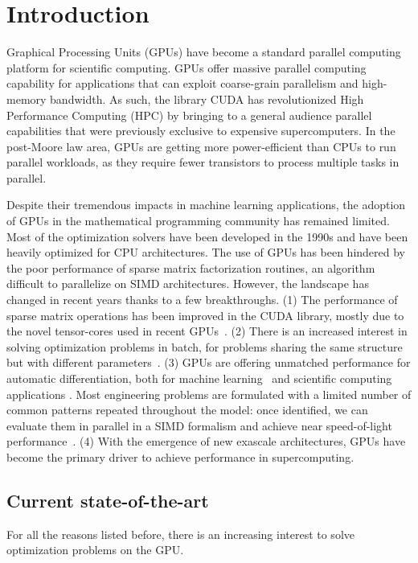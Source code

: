\section{Introduction}
Graphical Processing Units (GPUs) have become a standard parallel computing platform
for scientific computing.
GPUs offer massive parallel computing capability for applications
that can exploit coarse-grain parallelism and high-memory bandwidth.
As such, the library CUDA has revolutionized High Performance Computing (HPC)
by bringing to a general audience parallel capabilities that were previously
exclusive to expensive supercomputers. In the post-Moore law area, GPUs
are getting more power-efficient than CPUs to run parallel workloads, as they require
fewer transistors to process multiple tasks in parallel.

Despite their tremendous impacts in machine learning applications, the
adoption of GPUs in the mathematical programming community has
remained limited. Most of the optimization solvers have been developed
in the 1990s and have been heavily optimized for CPU architectures.
The use of GPUs has been hindered by the poor performance of
sparse matrix factorization routines, an algorithm difficult to parallelize
on SIMD architectures. However, the landscape has changed in
recent years thanks to a few breakthroughs.
(1) The performance of sparse matrix operations has been improved
in the CUDA library, mostly due to the novel tensor-cores used
in recent GPUs~\cite{markidis2018nvidia}.
(2) There is an increased interest in solving optimization
problems in batch, for problems sharing the same
structure but with different parameters~\cite{amos2017optnet,pineda2022theseus}.
(3) GPUs are offering unmatched performance for automatic differentiation,
both for machine learning~\cite{jax2018github} and scientific computing applications \cite{enzyme2021}.
Most engineering problems are formulated with a limited
number of common patterns repeated throughout the model: once
identified, we can evaluate them in parallel in a SIMD formalism
and achieve near speed-of-light performance~\cite{shin2023accelerating}.
(4) With the emergence of new exascale architectures,
GPUs have become the primary driver to achieve performance in
supercomputing.

\subsection{Current state-of-the-art}
For all the reasons listed before, there is an increasing interest
to solve optimization problems on the GPU.

